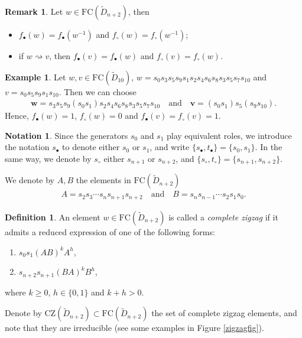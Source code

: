 \documentclass{amsart}
\newcommand{\D}{{\widetilde{D}_{n+2}}}
\newcommand{\fc}{{\mathrm{FC}}}
\newcommand{\s}{{s_{\bullet}}}
\newcommand{\ti}{{t_{\bullet}}}
\newcommand{\sn}{{s_\circ}}
\newcommand{\tn}{{t_\circ}}
\newcommand{\zz}{\mathrm{CZ}}
\newcommand{\fzp}{A}
\newcommand{\fzs}{B}
\newcommand{\red}{\rightsquigarrow}
\theoremstyle{definition}
\newtheorem{Definition}[Theorem]{Definition}
\newtheorem{Remark}[Theorem]{Remark}
\newtheorem{Example}[Theorem]{Example}
\newtheorem{Notation}[Theorem]{Notation}
\begin{document}
\begin{Remark}
\label{rem:occirr}
Let $w\in \fc(\D)$, then
\begin{itemize}
    \item[(1)] $f_\bullet(w) = f_\bullet(w^{-1})$ and $f_\circ(w) = f_\circ(w^{-1})$;
    \item[(2)] if $ w \red v  $, then $f_\bullet(v)=f_\bullet(w)$ and $f_\circ(v)=f_\circ(w)$.
\end{itemize}
 
\end{Remark}




\begin{Example}
\label{exocc}
Let $w,v\in \fc(\widetilde{D}_{10})$, $w=s_0s_3s_5s_9s_1s_2s_4s_6s_8s_3s_5s_7s_{10}$ and $v=s_0s_5s_{9}s_{1}s_{10}$. Then we can choose
\begin{align*}   \mathbf{w}=s_3s_5s_9(s_0s_1)s_2s_4s_6s_8s_3s_5s_7s_{10} \quad\mbox{and}\quad
    \mathbf{v}=(s_0s_1)s_5(s_9s_{10}).
\end{align*}
Hence, $f_\bullet(w)=1$, $f_\circ(w)=0$ and $f_\bullet(v)=f_\circ(v)=1$.
\end{Example}

\begin{Notation}
\label{helpestremi}
Since the generators $s_0$ and $s_1$ play equivalent roles, we introduce the notation $s_\bullet$ to denote either $s_0$ or $s_1$, and write $\{\s,\ti\}=\{s_0,s_1\}$. In the same way, we denote by $\sn$ either $s_{n+1}$ or $s_{n+2}$, and $\{\sn,\tn\}=\{s_{n+1},s_{n+2}\}$. 
\end{Notation}


We denote by $\fzp,\fzs$ the elements in $\fc(\D)$
\begin{align}
    \fzp=s_2s_3\cdots s_ns_{n+1}s_{n+2}\quad \mbox{and} \quad   \fzs=s_ns_{n-1}\cdots s_{2}s_1s_0.\label{eq:AB}
\end{align}

\begin{Definition}
\label{def:zigzag}
An element $w\in \fc(\D)$  is called a \textit{complete zigzag}  if it admits a reduced expression of one of the following forms:
\begin{enumerate}
    \item $s_0s_1(AB)^kA^h$,
    \item $s_{n+2}s_{n+1}(BA)^kB^h$, 
\end{enumerate}
where $k\ge 0$, $h\in \{0,1\}$ and $k+h >0$.

\end{Definition}
Denote by $ \zz(\D) \subset \fc(\D) $ the set of complete zigzag elements, and note that they are irreducible (see some examples in Figure \ref{zigzagfig}).
\end{document}
